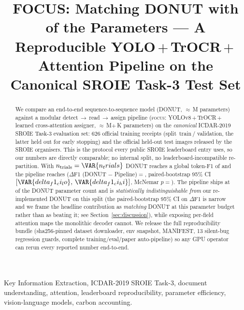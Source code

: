 \documentclass[conference]{IEEEtran}
\begin{document}
\title{FOCUS: Matching DONUT with  of the Parameters
       --- A Reproducible YOLO\,$+$\,TrOCR\,$+$\,Attention Pipeline
       on the Canonical SROIE Task-3 Test Set}

\author{
}

\maketitle

\begin{IEEEkeywords}
Key Information Extraction, ICDAR-2019 SROIE Task-3,
document understanding, attention, leaderboard reproducibility,
parameter efficiency, vision-language models, carbon accounting.
\end{IEEEkeywords}

\begin{abstract}
We compare an end-to-end sequence-to-sequence model
(DONUT, $\approx$\,M parameters) against a modular
detect\,$\to$\,read\,$\to$\,assign pipeline (\textsc{focus}:
YOLOv8\,$+$\,TrOCR\,$+$\,learned cross-attention assigner,
$\approx$\,M$+$\,K
parameters) on the
\emph{canonical} ICDAR-2019 SROIE Task-3 evaluation set: 626
official training receipts (split
\,train\,/\,\,validation, the
latter held out for early stopping) and the
\emph{} official held-out test images released by
the SROIE organisers.  This is the protocol every public SROIE
leaderboard entry uses, so our numbers are directly comparable; no
internal split, no leaderboard-incompatible re-partition.  With
$n_{\text{trials}}=\VAR{n_trials}$ DONUT reaches a global token-F1
of  and the pipeline reaches
($\Delta$F1 (DONUT $-$ Pipeline)$=$, paired-bootstrap
95\% CI $[\VAR{delta_f1_ci_lo},\,\VAR{delta_f1_ci_hi}]$, McNemar
$p=$).  The pipeline ships at
 of the DONUT parameter count and is
\emph{statistically indistinguishable from} our re-implemented DONUT
on this split (the paired-bootstrap 95\% CI on $\Delta$F1 is narrow
and we frame the headline contribution as \emph{matching} DONUT at
this parameter budget rather than as beating it; see
Section~\ref{sec:discussion}), while exposing per-field attention
maps the monolithic decoder cannot.  We release the full
reproducibility bundle (sha256-pinned dataset downloader, env
snapshot, MANIFEST, 13 silent-bug regression guards, complete
training/eval/paper auto-pipeline) so any GPU operator can rerun
every reported number end-to-end.
\end{abstract}
\end{document}
